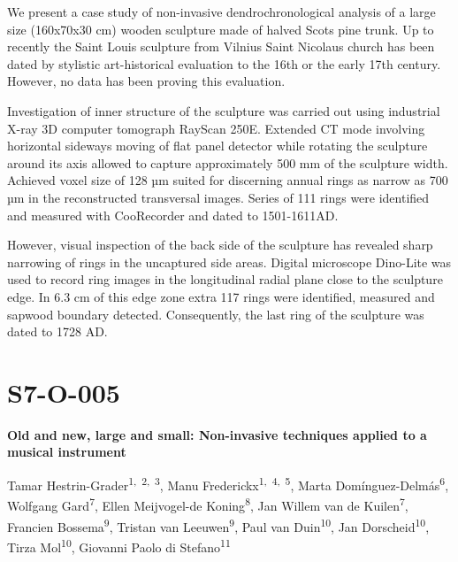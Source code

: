 \documentclass[
]{book}
\begin{document}
We present a case study of non-invasive dendrochronological analysis of a large size (160x70x30 cm) wooden sculpture made of halved Scots pine trunk. Up to recently the Saint Louis sculpture from Vilnius Saint Nicolaus church has been dated by stylistic art-historical evaluation to the 16th or the early 17th century. However, no data has been proving this evaluation.

Investigation of inner structure of the sculpture was carried out using industrial X-ray 3D computer tomograph RayScan 250E. Extended CT mode involving horizontal sideways moving of flat panel detector while rotating the sculpture around its axis allowed to capture approximately 500 mm of the sculpture width. Achieved voxel size of 128 µm suited for discerning annual rings as narrow as 700 µm in the reconstructed transversal images. Series of 111 rings were identified and measured with CooRecorder and dated to 1501-1611AD.

However, visual inspection of the back side of the sculpture has revealed sharp narrowing of rings in the uncaptured side areas. Digital microscope Dino-Lite was used to record ring images in the longitudinal radial plane close to the sculpture edge. In 6.3 cm of this edge zone extra 117 rings were identified, measured and sapwood boundary detected. Consequently, the last ring of the sculpture was dated to 1728 AD.

\hypertarget{s7-o-005}{%
\section*{S7-O-005}\label{s7-o-005}}

\textbf{Old and new, large and small: Non-invasive techniques applied to a musical instrument}

Tamar Hestrin-Grader\textsuperscript{1,~2,~3}, Manu Frederickx\textsuperscript{1,~4,~5}, Marta Domínguez-Delmás\textsuperscript{6}, Wolfgang Gard\textsuperscript{7}, Ellen Meijvogel-de Koning\textsuperscript{8}, Jan Willem van de Kuilen\textsuperscript{7}, Francien Bossema\textsuperscript{9}, Tristan van Leeuwen\textsuperscript{9}, Paul van Duin\textsuperscript{10}, Jan Dorscheid\textsuperscript{10}, Tirza Mol\textsuperscript{10}, Giovanni Paolo di Stefano\textsuperscript{11}
\end{document}
